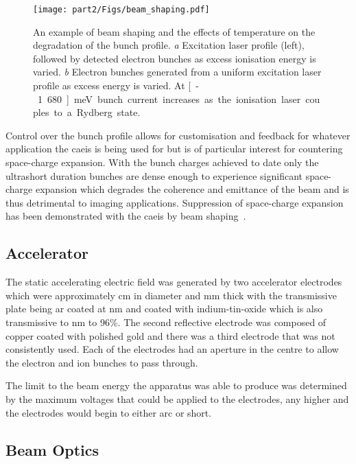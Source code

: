 \begin{figure}
    \center
    \texttt{[image: part2/Figs/beam\_shaping.pdf]}
    \caption[Beam shaping and the effects of temperature.]{An example of beam shaping and the effects of temperature on the degradation of the bunch profile.
    \emph{a} Excitation laser profile (left), followed by detected electron bunches as excess ionisation energy is varied.
    \emph{b} Electron bunches generated from a uniform excitation laser profile as excess energy is varied.
    At \unit[-1.680]{meV} bunch current increases as the ionisation laser couples to a Rydberg state.}
    \label{figure:beam_shaping}
\end{figure}

Control over the bunch profile allows for customisation and feedback for whatever application the \gls{caeis} is being used for but is of particular interest for countering space-charge expansion.
With the bunch charges achieved to date only the ultrashort duration bunches are dense enough to experience significant space-charge expansion which degrades the coherence and emittance of the beam and is thus detrimental to imaging applications.
Suppression of space-charge expansion has been demonstrated with the \gls{caeis} by beam shaping~\cite{luiten_how_2004,thompson_suppression_2016}.

\subsection{Accelerator}

The static accelerating electric field was generated by two accelerator electrodes which were approximately \unit[11]{cm} in diameter and \unit[4]{mm} thick with the transmissive plate being \gls{ar} coated at \unit[780]{nm} and coated with indium-tin-oxide which is also transmissive to \unit[780]{nm} to 96\%.
The second reflective electrode was composed of copper coated with polished gold and there was a third electrode that was not consistently used.
Each of the electrodes had an aperture in the centre to allow the electron and ion bunches to pass through.

The limit to the beam energy the apparatus was able to produce was determined by the maximum voltages that could be applied to the electrodes, any higher and the electrodes would begin to either arc or short.

\subsection{Beam Optics}

